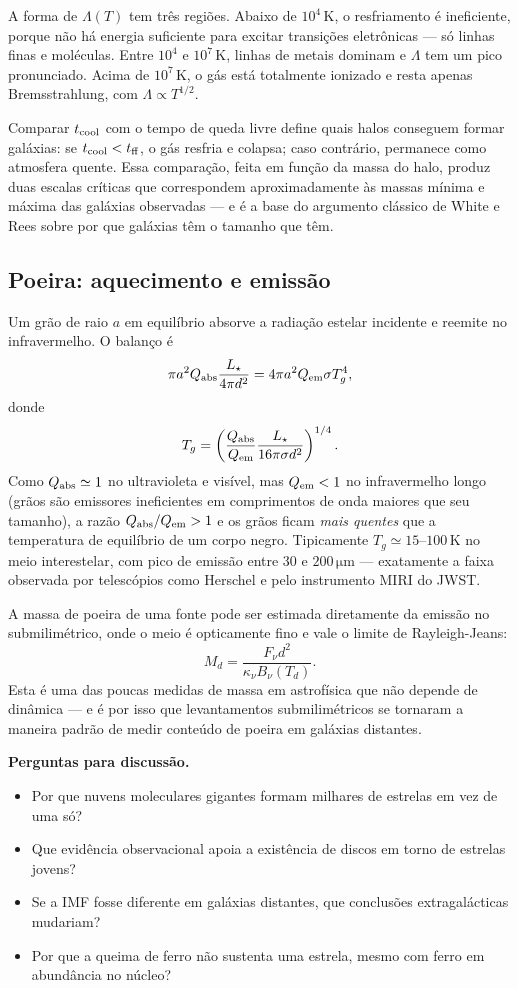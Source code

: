 \documentclass[11pt,a4paper]{article}
\begin{document}
A forma de $\Lambda(T)$ tem três regiões. Abaixo de $10^{4}\,\mathrm{K}$, o resfriamento é ineficiente, porque não há energia suficiente para excitar transições eletrônicas --- só linhas finas e moléculas. Entre $10^{4}$ e $10^{7}\,\mathrm{K}$, linhas de metais dominam e $\Lambda$ tem um pico pronunciado. Acima de $10^{7}\,\mathrm{K}$, o gás está totalmente ionizado e resta apenas Bremsstrahlung, com $\Lambda\propto T^{1/2}$.

Comparar $t_{\rm cool}$ com o tempo de queda livre define quais halos conseguem formar galáxias: se $t_{\rm cool}<t_{\rm ff}$, o gás resfria e colapsa; caso contrário, permanece como atmosfera quente. Essa comparação, feita em função da massa do halo, produz duas escalas críticas que correspondem aproximadamente às massas mínima e máxima das galáxias observadas --- e é a base do argumento clássico de White e Rees sobre por que galáxias têm o tamanho que têm.

\subsection*{Poeira: aquecimento e emissão}

Um grão de raio $a$ em equilíbrio absorve a radiação estelar incidente e reemite no infravermelho. O balanço é
\[
\pi a^{2}Q_{\rm abs}\frac{L_\star}{4\pi d^{2}}=4\pi a^{2}Q_{\rm em}\sigma T_g^{4},
\]
donde
\[
T_g=\left(\frac{Q_{\rm abs}}{Q_{\rm em}}\frac{L_\star}{16\pi\sigma d^{2}}\right)^{1/4}.
\]
Como $Q_{\rm abs}\simeq1$ no ultravioleta e visível, mas $Q_{\rm em}<1$ no infravermelho longo (grãos são emissores ineficientes em comprimentos de onda maiores que seu tamanho), a razão $Q_{\rm abs}/Q_{\rm em}>1$ e os grãos ficam \emph{mais quentes} que a temperatura de equilíbrio de um corpo negro. Tipicamente $T_g\simeq15$--$100\,\mathrm{K}$ no meio interestelar, com pico de emissão entre $30$ e $200\,\mathrm{\mu m}$ --- exatamente a faixa observada por telescópios como Herschel e pelo instrumento MIRI do JWST.

A massa de poeira de uma fonte pode ser estimada diretamente da emissão no submilimétrico, onde o meio é opticamente fino e vale o limite de Rayleigh-Jeans:
\[
M_d=\frac{F_\nu d^{2}}{\kappa_\nu B_\nu(T_d)}.
\]
Esta é uma das poucas medidas de massa em astrofísica que não depende de dinâmica --- e é por isso que levantamentos submilimétricos se tornaram a maneira padrão de medir conteúdo de poeira em galáxias distantes.

\textbf{Perguntas para discussão.}
\begin{itemize}
\item Por que nuvens moleculares gigantes formam milhares de estrelas em vez de uma só?
\item Que evidência observacional apoia a existência de discos em torno de estrelas jovens?
\item Se a IMF fosse diferente em galáxias distantes, que conclusões extragalácticas mudariam?
\item Por que a queima de ferro não sustenta uma estrela, mesmo com ferro em abundância no núcleo?
\end{itemize}
\end{document}
